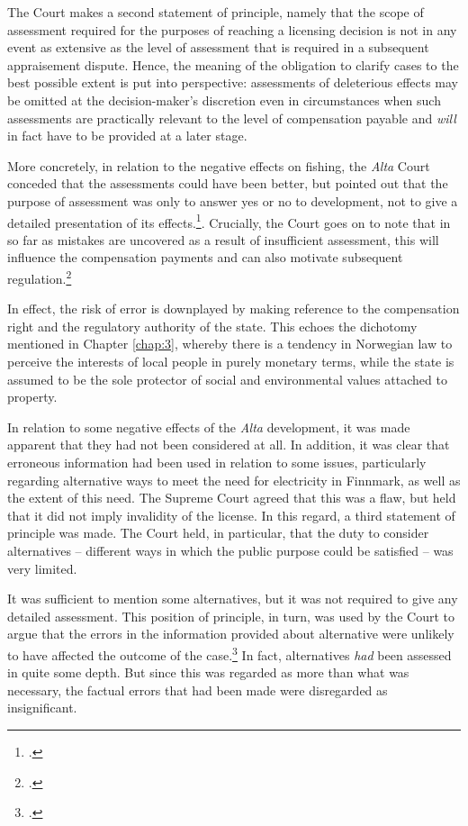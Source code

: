 The Court makes a second statement of principle, namely that the scope of assessment required for the purposes of reaching a licensing decision is not in any event as extensive as the level of assessment that is required in a subsequent appraisement dispute. Hence, the meaning of the obligation to clarify cases to the best possible extent is put into perspective: assessments of deleterious effects may be omitted at the decision-maker's discretion even in circumstances when such assessments are practically relevant to the level of compensation payable and {\it will} in fact have to be provided at a later stage.

More concretely, in relation to the negative effects on fishing, the {\it Alta} Court conceded that the assessments could have been better, but pointed out that the purpose of assessment was only to answer yes or no to development, not to give a detailed presentation of its effects.\footcite[330]{alta82}. Crucially, the Court goes on to note that in so far as mistakes are uncovered as a result of insufficient assessment, this will influence the compensation payments and can also motivate subsequent regulation.\footcite[330]{alta82} 

In effect, the risk of error is downplayed by making reference to the compensation right and the regulatory authority of the state. This echoes the dichotomy mentioned in Chapter \ref{chap:3}, whereby there is a tendency in Norwegian law to perceive the interests of local people in purely monetary terms, while the state is assumed to be the sole protector of social and environmental values attached to property.

In relation to some negative effects of the {\it Alta} development, it was made apparent that they had not been considered at all. In addition, it was clear that erroneous information had been used in relation to some issues, particularly regarding alternative ways to meet the need for electricity in Finnmark, as well as the extent of this need. The Supreme Court agreed that this was a flaw, but held that it did not imply invalidity of the license. In this regard, a third statement of principle was made. The Court held, in particular, that the duty to consider alternatives -- different ways in which the public purpose could be satisfied -- was very limited.

It was sufficient to mention some alternatives, but it was not required to give any detailed assessment. This position of principle, in turn, was used by the Court to argue that the errors in the information provided about alternative were unlikely to have affected the outcome of the case.\footcite[346]{alta82} In fact, alternatives {\it had} been assessed in quite some depth. But since this was regarded as more than what was necessary, the factual errors that had been made were disregarded as insignificant. 

